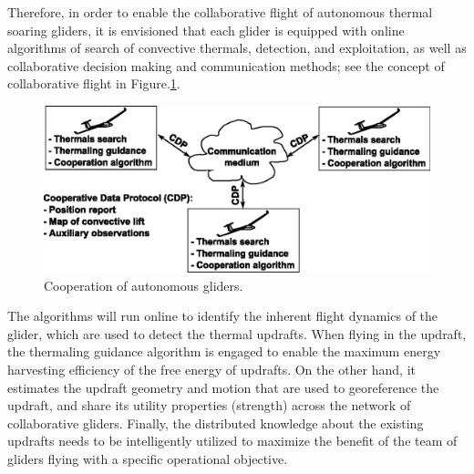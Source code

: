 \documentclass[letterpaper, 10 pt, conference]{ieeeconf}  %
\newcommand{\squeezeup}{\vspace{-1.0mm}}
\begin{document}
Therefore, in order to enable the collaborative flight of autonomous thermal soaring gliders, it is envisioned that each glider is equipped with online algorithms of search of convective thermals, detection, and exploitation, as well as collaborative decision making and communication methods; see the concept of collaborative flight in Figure.\ref{fig:coop_scheme}.
\begin{figure}[thpb]
  \centering
  \includegraphics[scale=0.5]{Figures/coop_scheme_small.eps}
  \caption{Cooperation of autonomous gliders.}
  \label{fig:coop_scheme}
\end{figure}
\squeezeup
The algorithms will run online to identify the inherent flight dynamics of the glider, which are used to detect the thermal updrafts. When flying in the updraft, the thermaling guidance algorithm is engaged to enable the maximum energy harvesting efficiency of the free energy of updrafts. On the other hand, it estimates the updraft geometry and motion that are used to georeference the updraft, and share its utility properties (strength) across the network of collaborative gliders. Finally, the distributed knowledge about the existing updrafts needs to be intelligently utilized to maximize the benefit of the team of gliders flying with a specific operational objective.
\end{document}

